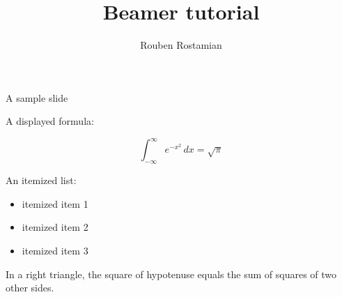 \documentclass[dvipsnames]{beamer}
\author{Rouben Rostamian}
\title{Beamer tutorial}
\institute{UMBC}
\begin{document}
\begin{frame}{A sample slide}

A displayed formula:

\[
  \int_{-\infty}^\infty e^{-x^2} \, dx = \sqrt{\pi}
\]

An itemized list:

\begin{itemize}
  \item itemized item 1
  \item itemized item 2
  \item itemized item 3
\end{itemize}

\begin{theorem}
  In a right triangle, the square of hypotenuse equals
  the sum of squares of two other sides.
\end{theorem}

\end{frame}
\end{document}
